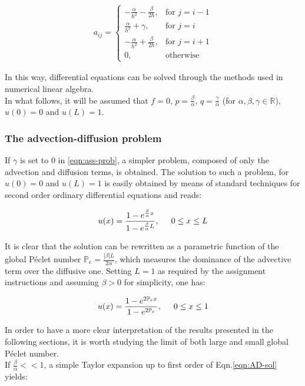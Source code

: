 \documentclass[11pt]{article}
\theoremstyle{theorem}
\theoremstyle{definition}
\begin{document}
\begin{align}
	\label{eqn:matrix}
	a_{ij} = \begin{cases}
	-\frac{\alpha}{h^2}-\frac{\beta}{2h}, & \text{for } j=i-1\\
	\frac{\alpha}{h^2}+\gamma, & \text{for } j=i\\
	-\frac{\alpha}{h^2}+\frac{\beta}{2h}, & \text{for } j=i+1\\
	0, &\text{otherwise}
	\end{cases}
\end{align}
	
In this way, differential equations can be solved through the methods used in numerical linear algebra.\\

In what follows, it will be assumed that $f=0$,  $p=\frac{\beta}{\alpha}$, $q=\frac{\gamma}{\alpha}$ (for $\alpha, \beta, \gamma\in\mathbb{R}$), $u(0)=0$ and $u(L)=1$.

\subsubsection{The advection-diffusion problem}
\label{subsubsec:ADprob}
If $\gamma$ is set to $0$ in \eqref{eqn:ass-prob}, a simpler problem, composed of only the advection and diffusion terms, is obtained. The solution to such a problem, for $u(0)=0$ and $u(L)=1$ is easily obtained by means of standard techniques for second order ordinary differential equations and reads:

\begin{align}
	\label{eqn:AD-sol}
	u(x)=\frac{1-e^{\frac{\beta}{\alpha}x}}{1-e^{\frac{\beta}{\alpha}L}},\hspace{5mm} 0\le x\le L
\end{align}

It is clear that the solution can be rewritten as a parametric function of the global P\'{e}clet number $\mathbb{P}_e=\frac{|\beta|L}{2\alpha}$, which measures the dominance of the advective term over the diffusive one. Setting $L=1$ as required by the assignment instructions and assuming $\beta>0$ for simplicity, one has:

$$	u(x)=\frac{1-e^{2\mathbb{P}_ex}}{1-e^{2\mathbb{P}_e}}, \hspace{5mm} 0\le x\le 1 $$

In order to have a more clear interpretation of the results presented in the following sections, it is worth studying the limit of both large and small global P\'{e}clet number.\\
If $\frac{\beta}{\alpha}<<1$, a simple Taylor expansion up to first order of Eqn.\eqref{eqn:AD-sol} yields:
\end{document}
